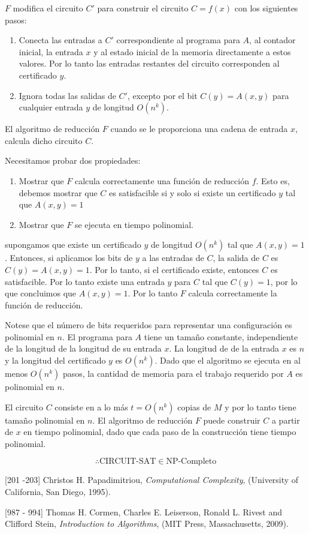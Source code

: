 \documentclass[letterpaper,12pt]{article}
\begin{document}
$F$ modifica el circuito $C'$ para construir el circuito $C=f(x)$ con los siguientes
 pasos:

\begin{enumerate}
	\item Conecta las entradas a $C'$ correspondiente al programa para $A$, al 
	contador inicial, la entrada $x$ y al estado inicial de la memoria directamente
	a estos valores. Por lo tanto las entradas restantes del circuito corresponden al
	certificado $y$.
	\item Ignora todas las salidas de $C'$, excepto por el bit $C(y) = A(x,y)$ 
	para cualquier entrada $y$ de longitud $O(n^k)$.
\end{enumerate}

El algoritmo de reducción $F$ cuando se le proporciona una cadena de entrada $x$, 
calcula dicho circuito $C$.

Necesitamos probar dos propiedades:

\begin{enumerate}
	\item Mostrar que $F$ calcula correctamente una función de reducción $f$. Esto es, 
	debemos mostrar que $C$ es satisfacible si y solo si existe un certificado $y$ 
	tal que $A(x,y) = 1$
	\item Mostrar que $F$ se ejecuta en tiempo polinomial. 
\end{enumerate}

supongamos que existe un certificado $y$ de longitud $O(n^k)$ tal que $A(x,y)=1$. 
Entonces, si aplicamos los bits de $y$ a las entradas de $C$, la salida de $C$ es 
$C(y)=A(x,y)=1$. Por lo tanto, si el certificado existe, entonces $C$ es 
satisfacible. Por lo tanto existe una entrada $y$ para $C$ tal que $C(y)=1$, por lo
que concluimos que $A(x,y)=1$. Por lo tanto $F$ calcula correctamente la función
de reducción.

Notese que el número de bits requeridos para representar una configuración es 
polinomial en $n$. El programa para $A$ tiene un tamaño constante, independiente
de la longitud de la longitud de su entrada $x$. La longitud de de la entrada $x$
es $n$ y la longitud del certificado $y$ es $O(n^k)$. Dado que el algoritmo se 
ejecuta en al menos $O(n^k)$ pasos, la cantidad de memoria para el trabajo requerido
por $A$ es polinomial en $n$.

El circuito $C$ consiste en a lo más $t=O(n^k)$ copias de $M$ y por lo tanto
tiene tamaño polinomial en $n$. El algoritmo de reducción $F$ puede construir $C$
a partir de $x$ en tiempo polinomial, dado que cada paso de la construcción tiene
tiempo polinomial.

$$ \therefore \text{CIRCUIT-SAT} \in \text{NP-Completo} $$

\begin{thebibliography}{99}

[201 -203] Christos H. Papadimitriou, \textit{Computational Complexity},
(University of California, San Diego, 1995).

[987 - 994] Thomas H. Cormen, Charles E. Leiserson, Ronald L. Rivest and 
Clifford Stein, \textit{Introduction to Algorithms},
(MIT Press, Massachusetts, 2009).

\end{thebibliography}
\end{document}
